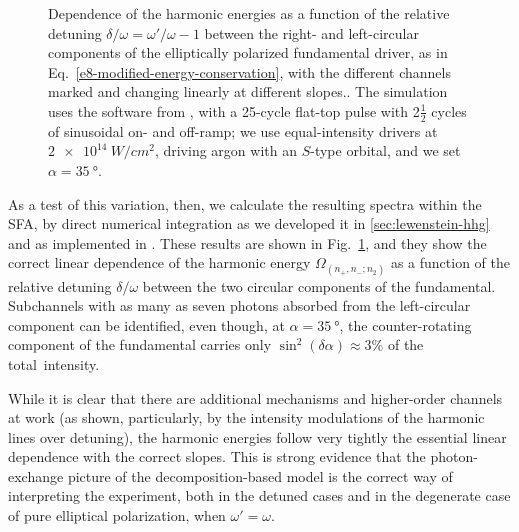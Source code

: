 \begin{figure}[b!]
  \captionsetup{width=\textwidth}
  \caption[
  Harmonic spectra for detuned bicircular drivers as a function of the relative detuning $\delta=\omega'/\omega-1$ between the right- and left-circular components of the elliptically polarized fundamental driver
  ]{
  Dependence of the harmonic energies as a function of the relative detuning $\delta/\omega = \omega'/ \omega-1$ between the right- and left-circular components of the elliptically polarized fundamental driver, as in Eq.~\eqref{e8-modified-energy-conservation}, with the different channels marked and changing linearly at different slopes..
  The simulation uses the software from , with a 25-cycle flat-top pulse with 2$\tfrac 12$ cycles of sinusoidal on- and off-ramp; we use equal-intensity drivers at $\SI{2e14}{W/cm^2}$, driving argon with an $S$-type orbital, and we set $\alpha=\SI{35}{\degree}$.
  }
  \label{f8-SFA-splittings-spectrum}
\end{figure}


As a test of this variation, then, we calculate the resulting spectra within the SFA, by direct numerical integration as we developed it in \ref{sec:lewenstein-hhg} and as implemented in . These results are shown in Fig.~\ref{f8-SFA-splittings-spectrum}, and they show the correct linear dependence of the harmonic energy $\Omega_{(n_+,n_-;n_2)}$ as a function of the relative detuning $\delta/\omega$ between the two circular components of the fundamental. Subchannels with as many as seven photons absorbed from the left-circular component can be identified, even though, at $\alpha=\SI{35}{\degree}$, the counter-rotating component of the fundamental carries only $\sin^2(\delta\alpha)\approx 3\%$ of the total~intensity.





While it is clear that there are additional mechanisms and higher-order channels at work (as shown, particularly, by the intensity modulations of the harmonic lines over detuning), the harmonic energies follow very tightly the essential linear dependence with the correct slopes. This is strong evidence that the photon-exchange picture of the decomposition-based model is the correct way of interpreting the experiment, both in the detuned cases and in the degenerate case of pure elliptical polarization, when $\omega'=\omega$.












